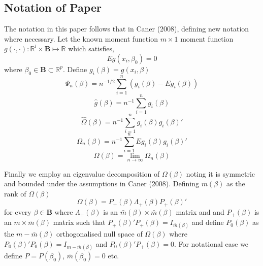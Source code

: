 \documentclass[11pt, fleqn]{article}
\begin{document}
\subsection{Notation of Paper}
The notation in this paper follows that  in Caner (2008), defining new notation where necessary.  Let the known moment function $m\times 1$ moment function $g(\cdot,\cdot): \mathbb{R}^l \times \mathbf{B}\mapsto\mathbb{R}$ which satisfies,
\begin{equation} \label{moment}Eg(x_i,\beta_0)=0 \end{equation}
where $\beta_0\in\mathbf{B} \subset \mathbb{R}^p$.  Define $g_i(\beta)=g(x_i,\beta)$
 \begin{equation*}
\Psi_n(\beta)=n^{-1/2}\sum_{i=1}^n(g_i(\beta)-Eg_i(\beta)) \end{equation*} \begin{equation*}
 \hat{g}(\beta)=n^{-1} \sum_{i=1}^n g_i(\beta)  \end{equation*}
  \begin{equation*}\hat{\Omega}(\beta)=n^{-1}\sum_{i=1}^n g_i(\beta) g_i(\beta)'\end{equation*} \begin{equation*} \Omega_n(\beta)=n^{-1}\sum_{i=1}^n Eg_i(\beta)g_i(\beta)' \end{equation*} \begin{equation*}\Omega(\beta)=\underset{n\rightarrow \infty}{ \lim} \Omega_n(\beta)\end{equation*}

Finally we employ an eigenvalue decomposition of $\Omega(\beta)$ noting it is symmetric and bounded under the assumptions in Caner (2008).  Defining $\bar{m}(\beta)$ as the rank of $\Omega(\beta)$ 
\begin{equation}\label{ed} \Omega(\beta)=P_+(\beta)\Lambda_+(\beta)P_+(\beta)'
\end{equation}
for every $\beta \in\mathbf{B}$ where $\Lambda_+(\beta)$ is an $\bar{m}(\beta)\times \bar{m}(\beta)$  matrix and and $P_+(\beta)$ is an $m\times \bar{m}(\beta)$ matrix such that $P_+(\beta)'P_+(\beta)=I_{\bar{m}(\beta)}$ and define $P_0(\beta)$ as the $m-\bar{m}(\beta)$ orthogonalised null space of $\Omega(\beta)$ where $P_0(\beta)'P_0(\beta)=I_{m-\bar{m}(\beta)}$ and $P_0(\beta)'P_+(\beta)=0$. For notational ease we define $P=P(\beta_0)$, $\bar{m}(\beta_0)=0$ etc.
\end{document}
